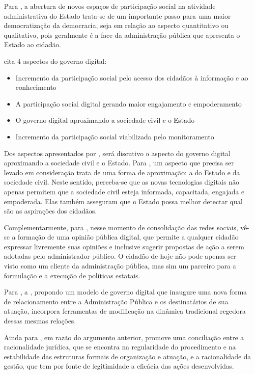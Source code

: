 Para \cite{carvalho2022nova}, a abertura de novos espaços de participação social na atividade administrativa do Estado trata-se de um importante passo para uma maior democratização da democracia, seja em relação ao aspecto quantitativo ou qualitativo, pois geralmente 
é a face da administração pública que apresenta o Estado ao cidadão.

\cite{carvalho2022nova} cita 4 aspectos do governo digital: 

\begin{itemize}
	\item Incremento da participação social pelo acesso dos 
cidadãos à informação e ao conhecimento
	\item A participação social digital gerando maior engajamento e 
empoderamento
	\item O governo digital aproximando a sociedade civil e o Estado
	\item Incremento da participação social viabilizada pelo monitoramento
\end{itemize}

Dos aspectos apresentados por \cite{carvalho2022nova}, será discutivo o aspecto do governo digital aproximando a sociedade civil e o Estado. Para \cite{carvalho2022nova}, um aspecto que precisa ser levado em consideração trata de uma forma de aproximação: a do Estado e da sociedade civil. Neste sentido, perceba-se que as novas tecnologias digitais não apenas permitem que a sociedade civil esteja informada, capacitada, engajada e empoderada. Elas também asseguram que o Estado possa melhor detectar qual são as aspirações dos cidadãos.

Complementarmente, para \cite{carvalho2022nova}, nesse momento de consolidação das redes sociais, vê-se a formação de uma opinião pública digital, que permite a qualquer cidadão expressar livremente suas opiniões e inclusive sugerir propostas de ação a serem adotadas pelo administrador público. O cidadão de hoje não pode apenas ser visto como um cliente da administração pública, mas sim um parceiro para a formulação e a execução de políticas estatais.

Para \cite{do2022governo}, a , propondo um modelo de governo digital que inaugure uma nova forma de relacionamento entre a Administração Pública e os destinatários de sua atuação, incorpora ferramentas de modificação na dinâmica tradicional regedora dessas mesmas relações.

Ainda para \cite{do2022governo}, em razão do argumento anterior, promove uma conciliação entre a racionalidade jurídica, que se encontra na regularidade do procedimento e na estabilidade das estruturas formais de organização e atuação, e a racionalidade da gestão, que tem por fonte de legitimidade a eficácia das ações desenvolvidas. 

